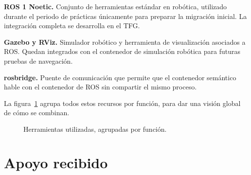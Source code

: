 \documentclass[11pt,fleqn,openany]{book} %
\begin{document}
\textbf{ROS 1 Noetic.} Conjunto de herramientas estándar en robótica, utilizado durante el periodo de prácticas únicamente para preparar la migración inicial. La integración completa se desarrolla en el TFG.

\textbf{Gazebo y RViz.} Simulador robótico y herramienta de visualización asociados a ROS. Quedan integrados con el contenedor de simulación robótica para futuras pruebas de navegación.

\textbf{rosbridge.} Puente de comunicación que permite que el contenedor semántico hable con el contenedor de ROS sin compartir el mismo proceso.

La figura~\ref{fig:herramientas} agrupa todos estos recursos por función, para dar una visión global de cómo se combinan.

\begin{figure}[h]
\centering
{}
\caption[Herramientas utilizadas durante las prácticas.]{Herramientas utilizadas, agrupadas por función.}
\label{fig:herramientas}
\end{figure}

\section{Apoyo recibido}
\end{document}
